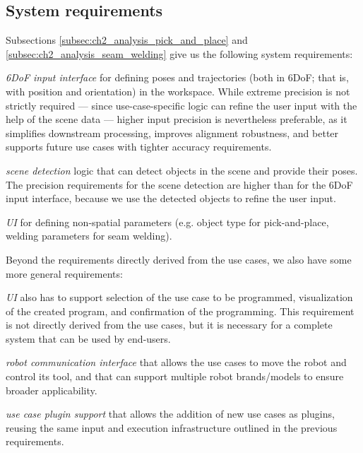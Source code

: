 \DIFaddend \subsection{System requirements} \label{subsec:ch2_analysis_system_requirements}

Subsections \ref{subsec:ch2_analysis_pick_and_place} and \ref{subsec:ch2_analysis_seam_welding} give us the following system requirements:
\begin{requirements}
    \item \emph{6DoF input interface} for defining poses and trajectories (both in 6DoF; that is, with position and orientation) in the workspace. While extreme precision is not strictly required --- since use-case-specific logic can refine the user input with the help of the scene data --- higher input precision is nevertheless preferable, as it simplifies downstream processing, improves alignment robustness, and better supports future use cases with tighter accuracy requirements. \label{req:6DoF_input_interface}
    \item \emph{scene detection} logic that can detect objects in the scene and provide their poses. The precision requirements for the scene detection are higher than for the 6DoF input interface, because we use the detected objects to refine the user input. \label{req:scene_detection_logic}
    \item \emph{UI} for defining non-spatial parameters (e.g. object type for pick-and-place, welding parameters for seam welding). \label{req:ui}
\end{requirements}

Beyond the requirements directly derived from the use cases, we also have some more general requirements:
\begin{requirements}[resume]
    \item \emph{UI} also has to support selection of the use case to be programmed, visualization of the created program, and confirmation of the programming. This requirement is not directly derived from the use cases, but it is necessary for a complete system that can be used by end-users. \label{req:ui_use_case_selection}
    \item \emph{robot communication interface} that allows the use cases to move the robot and control its tool, and that can support multiple robot brands/models to ensure broader applicability. \label{req:robot_communication_interface}
    \item \emph{use case plugin support} that allows the addition of new use cases as plugins, reusing the same input and execution infrastructure outlined in the previous requirements. \label{req:use_case_plugin_support}
\end{requirements}

